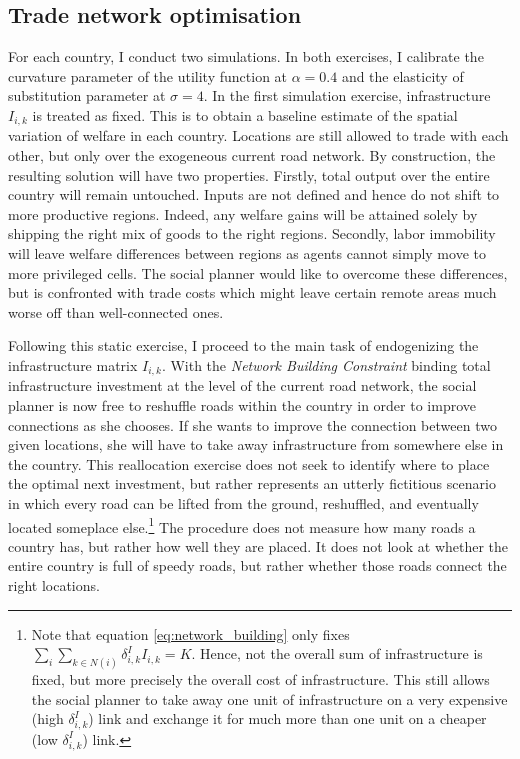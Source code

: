 \documentclass[11pt, oneside]{article}   	%
\begin{document}
\subsection{Trade network optimisation}

For each country, I conduct two simulations. In both exercises, I calibrate the curvature parameter of the utility function at $\alpha = 0.4$ and the elasticity of substitution parameter at $\sigma=4$. In the first simulation exercise, infrastructure $I_{i,k}$ is treated as fixed. This is to obtain a baseline estimate of the spatial variation of welfare in each country. Locations are still allowed to trade with each other, but only over the exogeneous current road network. By construction, the resulting solution will have two properties. Firstly, total output over the entire country will remain untouched. Inputs are not defined and hence do not shift to more productive regions. Indeed, any welfare gains will be attained solely by shipping the right mix of goods to the right regions. Secondly, labor immobility will leave welfare differences between regions as agents cannot simply move to more privileged cells. The social planner would like to overcome these differences, but is confronted with trade costs which might leave certain remote areas much worse off than well-connected ones.

Following this static exercise, I proceed to the main task of endogenizing the infrastructure matrix $I_{i,k}$. With the \emph{Network Building Constraint} binding total infrastructure investment at the level of the current road network, the social planner is now free to reshuffle roads within the country in order to improve connections as she chooses. If she wants to improve the connection between two given locations, she will have to take away infrastructure from somewhere else in the country. This reallocation exercise does not seek to identify where to place the optimal next investment, but rather represents an utterly fictitious scenario in which every road can be lifted from the ground, reshuffled, and eventually located someplace else.\footnote{Note that equation \eqref{eq:network_building} only fixes $\sum_{i}^{}\sum_{k \in N(i)}^{} \delta_{i,k}^{I}I_{i,k} = K$. Hence, not the overall sum of infrastructure is fixed, but more precisely the overall cost of infrastructure. This still allows the social planner to take away one unit of infrastructure on a very expensive (high $\delta_{i,k}^{I}$) link and exchange it for much more than one unit on a cheaper (low $\delta_{i,k}^{I}$) link.} The procedure does not measure how many roads a country has, but rather how well they are placed. It does not look at whether the entire country is full of speedy roads, but rather whether those roads connect the right locations.
\end{document}
